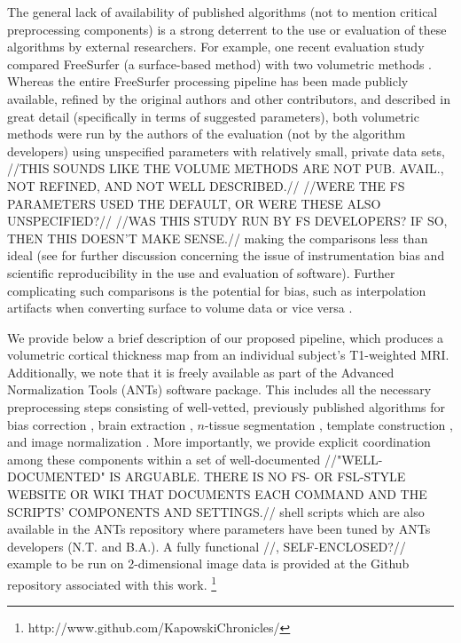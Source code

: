 The general lack of availability of published
algorithms \citep{kovacevic2006} (not to mention critical preprocessing
components) is a strong deterrent to the use or evaluation of these algorithms
by external researchers.  For example, one recent evaluation
study \citep{clarkson2011} compared
FreeSurfer (a surface-based method) with two volumetric methods \citep{jones2000,das2009}.
Whereas the entire FreeSurfer processing pipeline has been made publicly available, 
refined by the original authors and other contributors, and described in great detail 
(specifically in terms of suggested parameters), both volumetric methods were
run by the authors of the evaluation (not by the algorithm developers)
using unspecified parameters with relatively small, private data sets,
//THIS SOUNDS LIKE THE VOLUME METHODS ARE NOT PUB. AVAIL., NOT REFINED, AND NOT WELL DESCRIBED.//
//WERE THE FS PARAMETERS USED THE DEFAULT, OR WERE THESE ALSO UNSPECIFIED?//
//WAS THIS STUDY RUN BY FS DEVELOPERS? IF SO, THEN THIS DOESN'T MAKE SENSE.//
making the comparisons less than ideal (see \cite{tustison2013} for further discussion
concerning the issue of instrumentation bias and scientific reproducibility in the use and evaluation of software).
Further complicating such comparisons is the potential for bias, such as interpolation artifacts when
converting surface to volume data or vice versa \citep{klein2010}.

We provide below a brief description of our proposed pipeline, which produces a volumetric
cortical thickness map from an individual subject's T1-weighted MRI.
Additionally, we note that it is freely available as part of the Advanced Normalization Tools
(ANTs) software package.  This includes all the necessary preprocessing steps consisting
of well-vetted, previously published algorithms for bias correction \citep{tustison2010},
brain extraction \citep{avants2010a}, $n$-tissue segmentation \citep{avants2011a},
template construction \citep{avants2010}, and image normalization \citep{avants2011}.
More importantly, we provide explicit coordination among
these components within a set of well-documented
//"WELL-DOCUMENTED" IS ARGUABLE. THERE IS NO FS- OR FSL-STYLE WEBSITE OR WIKI
THAT DOCUMENTS EACH COMMAND AND THE SCRIPTS' COMPONENTS AND SETTINGS.//
shell scripts which
are also available in the ANTs repository where parameters have been tuned
by ANTs developers (N.T. and B.A.).  A fully functional //, SELF-ENCLOSED?// example
 to be run on 2-dimensional image data is provided
at the Github repository associated with this work.%
\footnote{
http://www.github.com/KapowskiChronicles/
}


